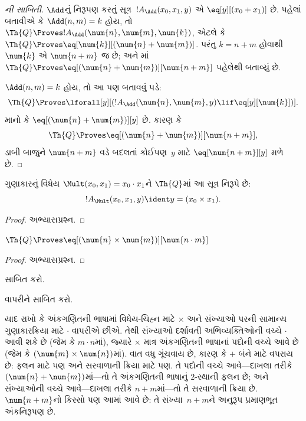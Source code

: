 \begin{proof}[ની સાબિતી]
$\Add$નું નિરૂપણ કરતું
સૂત્ર~$!A_\Add(x_0, x_1, y)$
એ $\eq[y][(x_0 + x_1)]$ છે.
પહેલાં બતાવીએ કે
$\Add(n, m) = k$ હોય, તો
$\Th{Q} \Proves
!A_\Add(\num{n}, \num{m}, \num{k})$,
એટલે કે $\Th{Q} \Proves
\eq[\num{k}][(\num{n} + \num{m})]$.
પરંતુ $k = n + m$ હોવાથી
$\num{k}$ એ $\num{n+m}$ જ છે;
અને માં
$\Th{Q} \Proves \eq[(\num{n} +
  \num{m})][\num{n+m}]$
પહેલેથી બતાવ્યું છે.

$\Add(n, m) = k$ હોય, તો આ પણ
બતાવવું પડે:
\[
\Th{Q} \Proves \lforall[y][(!A_\Add(\num{n}, \num{m}, y) \lif
  \eq[y][\num{k}])].
\]
માનો કે
$\eq[(\num{n} + \num{m})][y]$ છે.
કારણ કે
\[
\Th{Q} \Proves \eq[(\num{n}+\num{m})][\num{n+m}],
\]
ડાબી બાજુને $\num{n+m}$ વડે
બદલતાં કોઈપણ~$y$ માટે
$\eq[\num{n+m}][y]$ મળે છે.
\end{proof}

\begin{prop}
ગુણાકારનું વિધેય
$\Mult(x_0, x_1) = x_0 \cdot x_1$ને
$\Th{Q}$માં આ સૂત્ર નિરૂપે છે:
\[
  !A_{\Mult}(x_0, x_1, y) \ident y = (x_0 \times x_1).
\]
\end{prop}

\begin{proof} અભ્યાસપ્રશ્ન. \end{proof}

\begin{lem}
$\Th{Q} \Proves \eq[(\num{n} \times \num{m})][\num{n \cdot m}]$
\end{lem}

\begin{proof} અભ્યાસપ્રશ્ન. \end{proof}

\begin{prob}
સાબિત કરો.
\end{prob}

\begin{prob}
વાપરીને
સાબિત કરો.
\end{prob}

\begin{explain}
યાદ રાખો કે અંકગણિતની
ભાષામાં વિધેય-ચિહ્ન માટે
$\times$ અને સંખ્યાઓ પરની
સામાન્ય ગુણાકારક્રિયા માટે
$\cdot$ વાપરીએ છીએ.
તેથી સંખ્યાઓ દર્શાવતી
અભિવ્યક્તિઓની વચ્ચે
$\cdot$ આવી શકે છે (જેમ કે
$m \cdot n$માં), જ્યારે
$\times$ માત્ર અંકગણિતની
ભાષાનાં પદોની વચ્ચે આવે છે
(જેમ કે $(\num{m} \times
  \num{n})$માં). વાત વધુ
ગૂંચવાય છે, કારણ કે $+$
બંને માટે વપરાય છે:
ફલન માટે પણ અને
સરવાળાની ક્રિયા માટે પણ.
તે પદોની વચ્ચે આવે—દાખલા
તરીકે $(\num{n} + \num{m})$માં—તો
તે અંકગણિતની ભાષાનું $2$-સ્થાની
ફલન છે; અને સંખ્યાઓની
વચ્ચે આવે—દાખલા તરીકે
$n+m$માં—તો તે સરવાળાની
ક્રિયા છે. $\num{n+m}$નો
કિસ્સો પણ આમાં આવે છે:
તે સંખ્યા~$n+m$ને અનુરૂપ
પ્રમાણભૂત અંકનિરૂપણ છે.
\end{explain}
\endgroup


